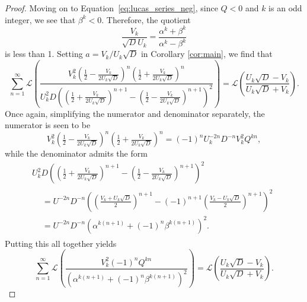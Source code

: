 \documentclass[10pt,a4paper]{amsart}
\begin{document}
\begin{proof}
   Moving on to Equation~\eqref{eq:lucas_series_neg}, since $Q < 0$ and $k$ is an odd integer, we see that $\beta^k < 0$.  Therefore, the quotient
\begin{equation*}
    \frac{V_k}{\sqrt{D} U_k} = \frac{\alpha^k + \beta^k}{\alpha^k - \beta^k}
\end{equation*}
is less than 1.  Setting $a = V_k/U_k \sqrt{D}$ in Corollary \ref{cor:main}, we find that
    \begin{equation*}
        \sum_{n=1}^{\infty}\mathcal{L}\left(\frac{V^2_k\left(\frac{1}{2}-\frac{V_k}{2U_k\sqrt{D}}\right)^{n}\left(\frac{1}{2} + \frac{V_k}{2U_k\sqrt{D}}\right)^{n}}{U^2_k D\left(\left(\frac{1}{2}+\frac{V_k}{2U_k\sqrt{D}}\right)^{n+1}-\left(\frac{1}{2} - \frac{V_k}{2U_k\sqrt{D}}\right)^{n+1}\right)^2}\right) = \mathcal{L}\left(\frac{U_k\sqrt{D}-V_k}{U_k\sqrt{D}+V_k}\right).
    \end{equation*}
    Once again, simplifying the numerator and denominator separately, the numerator is seen to be
    \begin{equation*}
        V^2_k\left(\tfrac{1}{2}-\tfrac{V_k}{2U_k\sqrt{D}}\right)^{n}\left(\tfrac{1}{2} + \tfrac{V_k}{2U_k\sqrt{D}}\right)^{n} = (-1)^n U^{-2n}_k D^{-n} V^2_k Q^{kn},
    \end{equation*}
    while the denominator admits the form
    \begin{multline*}
     U^2_k D\left(\left(\tfrac{1}{2}+\tfrac{V_k}{2U_k\sqrt{D}}\right)^{n+1}-\left(\tfrac{1}{2} - \tfrac{V_k}{2U_k\sqrt{D}}\right)^{n+1}\right)^2 \quad\quad \quad\quad \quad\quad \quad\quad {}\\
     \begin{aligned}
        &= U^{-2n}D^{-n}\left(\left(\tfrac{V_k+U_k\sqrt{D}}{2}\right)^{n+1}-(-1)^{n+1}\left(\tfrac{V_k-U_k\sqrt{D}}{2} \right)^{n+1}\right)^2 \\
        &= U^{-2n} D^{-n} (\alpha^{k(n+1)} + (-1)^{n} \beta^{k(n+1)})^2.
     \end{aligned}
    \end{multline*}
    Putting this all together yields 
    \begin{equation*}
        \sum_{n=1}^{\infty}\mathcal{L}\left(\frac{V^2_k (-1)^n Q^{kn}}{\left(\alpha^{k(n+1)}+(-1)^{n}\beta^{k(n+1)}\right)^2 }\right) = \mathcal{L}\left(\frac{U_k\sqrt{D}-V_k}{U_k\sqrt{D}+V_k}\right).
    \end{equation*}
    

\end{proof}
\end{document}
